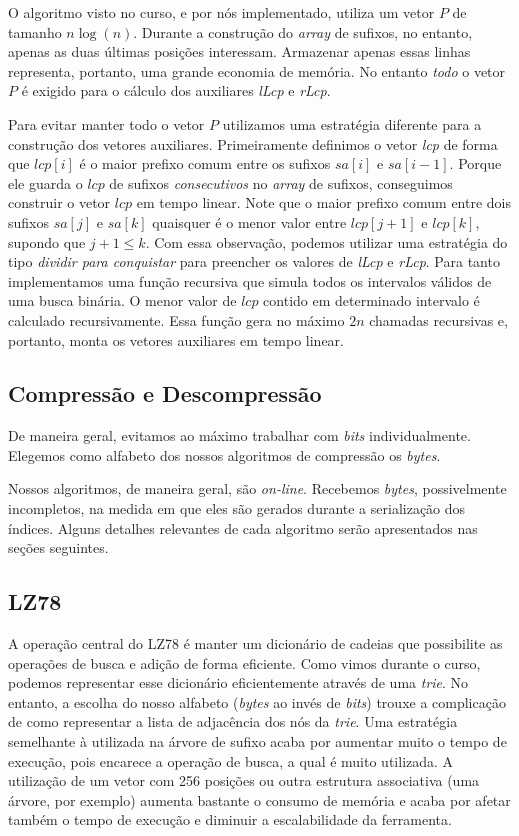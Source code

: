 \documentclass[]{article}
\begin{document}
O algoritmo visto no curso, e por nós implementado, utiliza um vetor $P$ de tamanho $n\log(n)$. Durante a construção do \textit{array} de sufixos, no entanto, apenas as duas últimas posições interessam. Armazenar apenas essas linhas representa, portanto, uma grande economia de memória. No entanto \textit{todo} o vetor $P$ é exigido para o cálculo dos auxiliares \textit{lLcp} e \textit{rLcp}.

Para evitar manter todo o vetor $P$ utilizamos uma estratégia diferente para a construção dos vetores auxiliares. Primeiramente definimos o vetor \textit{lcp} de forma que $lcp[i]$ é o maior prefixo comum entre os sufixos $sa[i]$ e $sa[i-1]$. Porque ele guarda o $lcp$ de sufixos \textit{consecutivos} no \textit{array} de sufixos, conseguimos construir o vetor $lcp$ em tempo linear. Note que o maior prefixo comum entre dois sufixos $sa[j]$ e $sa[k]$ quaisquer é o menor valor entre $lcp[j+1]$ e $lcp[k]$, supondo que $j+1 \leq k$. Com essa observação, podemos utilizar uma estratégia do tipo \textit{dividir para conquistar} para preencher os valores de \textit{lLcp} e \textit{rLcp}. Para tanto implementamos uma função recursiva que simula todos os intervalos válidos de uma busca binária. O menor valor de $lcp$ contido em determinado intervalo é calculado recursivamente. Essa função gera no máximo $2n$ chamadas recursivas e, portanto, monta os vetores auxiliares em tempo linear.


\subsection{Compressão e Descompressão}

De maneira geral, evitamos ao máximo trabalhar com \textit{bits} individualmente. Elegemos como alfabeto dos nossos algoritmos de compressão os \textit{bytes}.

Nossos algoritmos, de maneira geral, são \textit{on-line}. Recebemos \textit{bytes}, possivelmente incompletos, na medida em que eles são gerados durante a serialização dos índices. Alguns detalhes relevantes de cada algoritmo serão apresentados nas seções seguintes.

\subsection{LZ78}

A operação central do LZ78 é manter um dicionário de cadeias que possibilite as operações de busca e adição de forma eficiente. Como vimos durante o curso, podemos representar esse dicionário eficientemente através de uma \textit{trie}. No entanto, a escolha do nosso alfabeto (\textit{bytes} ao invés de \textit{bits}) trouxe a complicação de como representar a lista de adjacência dos nós da \textit{trie}. Uma estratégia semelhante à utilizada na árvore de sufixo acaba por aumentar muito o tempo de execução, pois encarece a operação de busca, a qual é muito utilizada. A utilização de um vetor com 256 posições ou outra estrutura associativa (uma árvore, por exemplo) aumenta bastante o consumo de memória e acaba por afetar também o tempo de execução e diminuir a escalabilidade da ferramenta.
\end{document}
